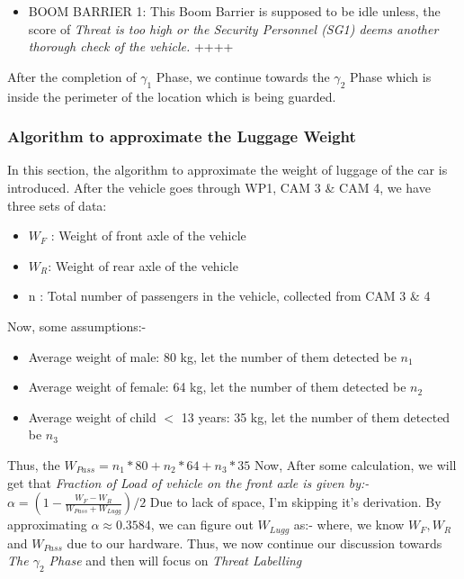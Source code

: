\documentclass[a4paper,11pt]{article}
\begin{document}
\begin{itemize}
\item{BOOM BARRIER 1: This Boom Barrier \textbf{\cite{Boom Barrier}} is supposed to be idle unless, the score of \textit{Threat is too high or the Security Personnel (SG1) deems another thorough check of the vehicle.}}
++++
\end{itemize}
After the completion of $\gamma_1$ Phase, we continue towards the $\gamma_2$ Phase which is inside the perimeter of the location which is being guarded.
\subsubsection{Algorithm to approximate the Luggage Weight}
In this section, the algorithm to approximate the weight of luggage of the car is introduced.\newline
After the vehicle goes through WP1, CAM 3 \& CAM 4, we have three sets of data:\newline
\begin{itemize}
\item{$W_F$ : Weight of front axle of the vehicle}
\item{$W_R$: Weight of rear axle of the vehicle}
\item{n : Total number of passengers in the vehicle, collected from CAM 3 \& 4}
\end{itemize} 
Now, some assumptions:-
\begin{itemize}
\item{Average weight of male: 80 kg, let the number of them detected be $n_1$}
\item{Average weight of female: 64 kg, let the number of them detected be $n_2$}
\item{Average weight of child $<$ 13 years: 35 kg, let the number of them detected be $n_3$}
\end{itemize}
Thus, the $W_{Pass} = n_1*80 + n_2*64 + n_3*35$\newline\newline
Now, After some calculation, we will get that \textit{Fraction of Load of vehicle on the front axle is given by:-}\newline\newline $\alpha = (1- \frac{W_F - W_R}{W_{Pass} + W_{Lugg}})/2$\newline
Due to lack of space, I'm skipping it's derivation.\newline\newline
By approximating $\alpha \approx 0.3584$, we can figure out $W_{Lugg}$ as:-\newline\newline
{}\newline where, we know $W_F, W_R $ and $ W_{Pass}$ due to our hardware.
\newline\newline
Thus, we now continue our discussion towards \textit{The $\gamma_2$ Phase} and then will focus on \textit{Threat Labelling} 
\end{document}
